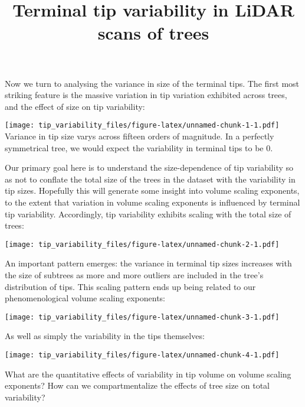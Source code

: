 \documentclass[]{article}
\title{Terminal tip variability in LiDAR scans of trees}
\author{}
\date{\vspace{-2.5em}}
\begin{document}
\maketitle

Now we turn to analysing the variance in size of the terminal tips. The
first most striking feature is the massive variation in tip variation
exhibited across trees, and the effect of size on tip variability:

\texttt{[image: tip\_variability\_files/figure-latex/unnamed-chunk-1-1.pdf]}
Variance in tip size varys across fifteen orders of magnitude. In a
perfectly symmetrical tree, we would expect the variability in terminal
tips to be 0.

Our primary goal here is to understand the size-dependence of tip
variability so as not to conflate the total size of the trees in the
dataset with the variability in tip sizes. Hopefully this will generate
some insight into volume scaling exponents, to the extent that variation
in volume scaling exponents is influenced by terminal tip variability.
Accordingly, tip variability exhibits scaling with the total size of
trees:

\texttt{[image: tip\_variability\_files/figure-latex/unnamed-chunk-2-1.pdf]}

An important pattern emerges: the variance in terminal tip sizes
increases with the size of subtrees as more and more outliers are
included in the tree's distribution of tips. This scaling pattern ends
up being related to our phenomenological volume scaling exponents:

\texttt{[image: tip\_variability\_files/figure-latex/unnamed-chunk-3-1.pdf]}

As well as simply the variability in the tips themselves:

\texttt{[image: tip\_variability\_files/figure-latex/unnamed-chunk-4-1.pdf]}

What are the quantitative effects of variability in tip volume on volume
scaling exponents? How can we compartmentalize the effects of tree size
on total variability?
\end{document}
